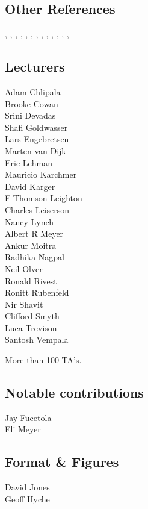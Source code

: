 \subsection*{Other References}

\cite{Apostol67},
\cite{Beam17},
\cite{Berkeley75},
\cite{Chow98},
\cite{Fagin95},
\cite{GareyJohnson70},
\cite{Gelfond34},
\cite{Malkiel03},
\cite{Meyer69},
\cite{MichaelsR91},
\cite{Paterson09},
\cite{Stockmeyer73},
\cite{Stueben98},


\subsection*{Lecturers}

Adam Chlipala\\
Brooke Cowan\\
Srini Devadas\\
Shafi Goldwasser\\
Lars Engebretsen\\
Marten van Dijk\\
Eric Lehman\\
Mauricio Karchmer\\
David Karger\\
F Thomson Leighton\\
Charles Leiserson\\
Nancy Lynch\\
Albert R Meyer\\
Ankur Moitra\\
Radhika Nagpal\\
Neil Olver\\
Ronald Rivest\\
Ronitt Rubenfeld\\
Nir Shavit\\
Clifford Smyth\\
Luca Trevison\\
Santosh Vempala

More than 100 TA's.

\subsection*{Notable contributions}

Jay Fucetola\\
Eli Meyer

\subsection*{Format \& Figures}
David Jones\\
Geoff Hyche

\endinput
